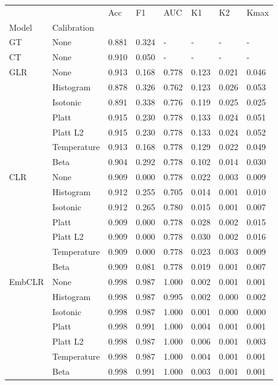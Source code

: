 \begin{tabular}{llllllll}
\toprule
 &  & Acc & F1 & AUC & K1 & K2 & Kmax \\
Model & Calibration &  &  &  &  &  &  \\
\midrule
GT & None & 0.881 & 0.324 & - & - & - & - \\
\cline{1-8}
CT & None & 0.910 & 0.050 & - & - & - & - \\
\cline{1-8}
\multirow[t]{7}{*}{GLR} & None & 0.913 & 0.168 & 0.778 & 0.123 & 0.021 & 0.046 \\
 & Histogram & 0.878 & 0.326 & 0.762 & 0.123 & 0.026 & 0.053 \\
 & Isotonic & 0.891 & 0.338 & 0.776 & 0.119 & 0.025 & 0.025 \\
 & Platt & 0.915 & 0.230 & 0.778 & 0.133 & 0.024 & 0.051 \\
 & Platt L2 & 0.915 & 0.230 & 0.778 & 0.133 & 0.024 & 0.052 \\
 & Temperature & 0.913 & 0.168 & 0.778 & 0.129 & 0.022 & 0.049 \\
 & Beta & 0.904 & 0.292 & 0.778 & 0.102 & 0.014 & 0.030 \\
\cline{1-8}
\multirow[t]{7}{*}{CLR} & None & 0.909 & 0.000 & 0.778 & 0.022 & 0.003 & 0.009 \\
 & Histogram & 0.912 & 0.255 & 0.705 & 0.014 & 0.001 & 0.010 \\
 & Isotonic & 0.912 & 0.265 & 0.780 & 0.015 & 0.001 & 0.007 \\
 & Platt & 0.909 & 0.000 & 0.778 & 0.028 & 0.002 & 0.015 \\
 & Platt L2 & 0.909 & 0.000 & 0.778 & 0.030 & 0.002 & 0.016 \\
 & Temperature & 0.909 & 0.000 & 0.778 & 0.023 & 0.003 & 0.009 \\
 & Beta & 0.909 & 0.081 & 0.778 & 0.019 & 0.001 & 0.007 \\
\cline{1-8}
\multirow[t]{7}{*}{EmbCLR} & None & 0.998 & 0.987 & 1.000 & 0.002 & 0.001 & 0.001 \\
 & Histogram & 0.998 & 0.987 & 0.995 & 0.002 & 0.000 & 0.002 \\
 & Isotonic & 0.998 & 0.987 & 1.000 & 0.001 & 0.000 & 0.000 \\
 & Platt & 0.998 & 0.991 & 1.000 & 0.004 & 0.001 & 0.001 \\
 & Platt L2 & 0.998 & 0.987 & 1.000 & 0.006 & 0.001 & 0.003 \\
 & Temperature & 0.998 & 0.987 & 1.000 & 0.004 & 0.001 & 0.001 \\
 & Beta & 0.998 & 0.991 & 1.000 & 0.003 & 0.001 & 0.001 \\
\cline{1-8}
\bottomrule
\end{tabular}
